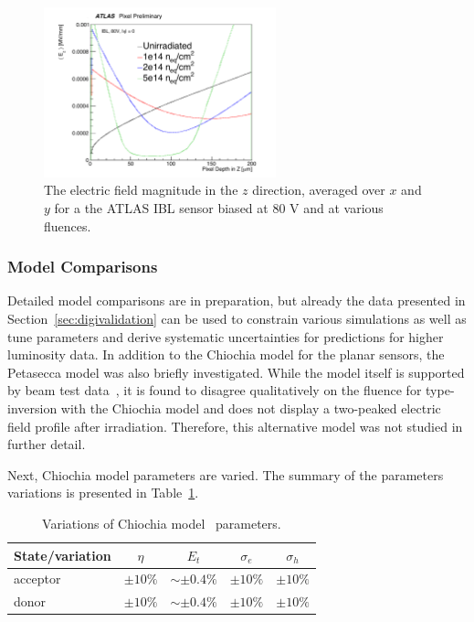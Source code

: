\begin{figure}[!htpb]
\centering
\includegraphics[width=0.6\textwidth]{newEz_0fluence80V.pdf}
\caption{The electric field magnitude in the $z$ direction, averaged over $x$ and $y$ for a the ATLAS IBL sensor biased at 80 V and at various fluences.}
\label{fig:electricfield:profilesRun23}
\end{figure}


\subsubsection{Model Comparisons}
\label{sec:Efieldmodelcomparisons}

Detailed model comparisons are in preparation, but already the data presented in Section~\ref{sec:digivalidation} can be used to constrain various simulations as well as tune parameters and derive systematic uncertainties for predictions for higher luminosity data.  In addition to the Chiochia model for the planar sensors, the Petasecca model was also briefly investigated.  While the model itself is supported by beam test data~\cite{1710302}, it is found to disagree qualitatively on the fluence for type-inversion with the Chiochia model and does not display a two-peaked electric field profile after irradiation.  Therefore, this alternative model was not studied in further detail.

Next, Chiochia model parameters are varied.
The summary of the parameters variations is presented in Table~\ref{tab:parVars}.

\begin{table}[!htpb]
\centering
\begin{tabular}{lcccc}
  \hline
  State/variation & $\eta$ & $E_t$ & $\sigma_e$ & $\sigma_h$		\\
   \hline
   \hline	
   acceptor & $\pm 10\%$ & $\sim\pm0.4\%$ & $\pm10\%$ & $\pm10\%$ \\
   donor & $\pm 10\%$ & $\sim\pm0.4\%$ & $\pm10\%$ & $\pm10\%$ \\
  \hline  
\end{tabular}
\caption{Variations of Chiochia model~\cite{Chiochia:2004qh} parameters.}
\label{tab:parVars}
\end{table}

